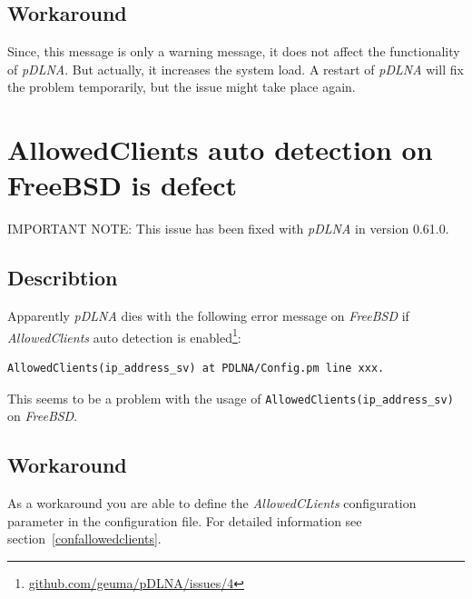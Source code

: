 \documentclass[a4paper,oneside,10pt]{report}
\newenvironment{colframeimportantnote}{%
  \begin{Sbox}
    \begin{minipage}{.99\columnwidth}
}{%
  \end{minipage}
  \end{Sbox}
  \begin{center}
    \fcolorbox{black}{Orange}{\TheSbox}
  \end{center}
}
\begin{document}
\subsection{Workaround}

Since, this message is only a warning message, it does not affect the functionality of {\em pDLNA}. But actually, it increases the system load. A restart of {\em pDLNA} will fix the problem temporarily, but the issue might take place again.

\section{AllowedClients auto detection on FreeBSD is defect}

\begin{colframeimportantnote}
\textsc{IMPORTANT NOTE:} This issue has been fixed with {\em pDLNA} in version 0.61.0.
\end{colframeimportantnote}

\subsection{Describtion}

Apparently {\em pDLNA} dies with the following error message on {\em FreeBSD} if {\em AllowedClients} auto detection is enabled\footnote{\url{github.com/geuma/pDLNA/issues/4}}:
\begin{lstlisting}
AllowedClients(ip_address_sv) at PDLNA/Config.pm line xxx.
\end{lstlisting}
This seems to be a problem with the usage of \verb|AllowedClients(ip_address_sv)| on {\em FreeBSD}.

\subsection{Workaround}

As a workaround you are able to define the {\em AllowedCLients} configuration parameter in the configuration file. For detailed information see section~\ref{confallowedclients}.
\end{document}
